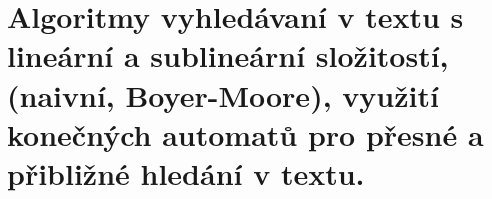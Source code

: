 \section[PAL - Automaty - vyhledávání textu]{Algoritmy vyhledávaní v textu s lineární a sublineární složitostí, (naivní, Boyer-Moore), využití konečných automatů pro přesné a přibližné hledání v textu. }

